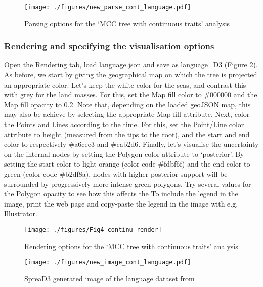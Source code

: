 \documentclass[english]{paper}
\def \spreadname {SpreaD3}
\begin{document}
\begin{figure}%
\centering
\texttt{[image: ./figures/new\_parse\_cont\_language.pdf]} %
\label{fig:parseMCCcont}
\caption{Parsing options for the `MCC tree with continuous traits' analysis}
\end{figure}

\subsubsection{Rendering and specifying the visualisation options}

Open the Rendering tab, load language.json and save as language\_D3 (Figure \ref{fig:renderMCCcont}).
As before, we start by giving the geographical map on which the tree is projected an appropriate color. 
Let's keep the white color for the seas, and contrast this with grey for the land masses. %
For this, set the Map fill color to \#000000 and the Map fill opacity to 0.2. 
Note that, depending on the loaded geoJSON map, this may also be achieve by selecting the appropriate Map fill attribute. 
Next, color the Points and Lines according to the time.
For this, set the Point/Line color attribute to height (measured from the tips to the root), and the start and end color to respectively \#a6cee3 and \#cab2d6.
Finally, let's visualise the uncertainty on the internal nodes by setting the Polygon color attribute to `posterior'.
By setting the start color to light orange (color code \#fdbf6f) and the end color to green (color code \#b2df8a), nodes with higher posterior support will be surrounded by progressively more intense green polygons.
Try several values for  the Polygon opacity to see how this affects the 
To include the legend in the image, print the web page and copy-paste the legend in the image with e.g. Illustrator. 

\begin{figure}%
\centering
\texttt{[image: ./figures/Fig4\_continu\_render]} 
\caption{Rendering options for the `MCC tree with continuous traits' analysis}
\label{fig:renderMCCcont}
\end{figure}

\begin{figure}%
\centering
\texttt{[image: ./figures/new\_image\_cont\_language.pdf]} 
\label{fig:imageMCCcont}
\caption{{\spreadname} generated image of the language dataset from \citet{Bouckaert:2012aa}}
\end{figure}
\end{document}
